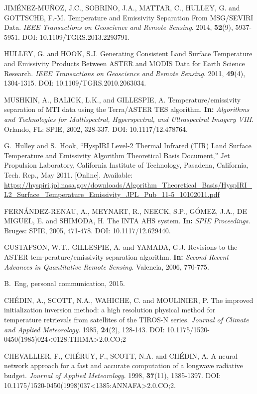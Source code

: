 \begin{thebibliography}{10}
 JIMÉNEZ-MUÑOZ, J.C., SOBRINO, J.A., MATTAR, C., HULLEY, G. and GOTTSCHE, F.-M. Temperature and Emissivity Separation From MSG/SEVIRI Data. \textit{IEEE Transactions on Geoscience and Remote Sensing}. 2014, \textbf{52}(9), 5937-5951. DOI: 10.1109/TGRS.2013.2293791. 

 HULLEY, G. and HOOK, S.J. Generating Consistent Land Surface Temperature and Emissivity Products Between ASTER and MODIS Data for Earth Science Research. \textit{IEEE Transactions on Geoscience and Remote Sensing}. 2011, \textbf{49}(4), 1304-1315. DOI: 10.1109/TGRS.2010.2063034.

 MUSHKIN, A., BALICK, L.K., and GILLESPIE, A. Temperature/emissivity separation of MTI data using the Terra/ASTER TES algorithm. \textbf{In:} \textit{Algorithms and Technologies for Multispectral, Hyperspectral, and Ultraspectral Imagery VIII}. Orlando, FL: SPIE, 2002, 328-337. DOI: 10.1117/12.478764.

G.~Hulley and S.~Hook, ``{HyspIRI} {Level}-2 {Thermal} {Infrared} ({TIR})
  {Land} {Surface} {Temperature} and {Emissivity} {Algorithm} {Theoretical}
  {Basis} {Document},'' Jet Propulsion Laboratory, California Institute of
  Technology, Pasadena, California, Tech. Rep., May 2011. [Online]. Available:
  \url{https://hyspiri.jpl.nasa.gov/downloads/Algorithm_Theoretical_Basis/HyspIRI_L2_Surface_Temperature_Emissivity_JPL_Pub_11-5_10102011.pdf}

 FERNÁNDEZ-RENAU, A., MEYNART, R., NEECK, S.P., GÓMEZ, J.A., DE MIGUEL, E. and SHIMODA, H. The INTA AHS system. \textbf{In:} \textit{SPIE Proceedings}. Bruges: SPIE, 2005, 471-478. DOI: 10.1117/12.629440.

 GUSTAFSON, W.T., GILLESPIE, A. and YAMADA, G.J. Revisions to the ASTER tem-perature/emissivity separation algorithm. \textbf{In:} \textit{Second Recent Advances in Quantitative Remote Sensing}. Valencia, 2006, 770-775.


B.~Eng, personal communication, 2015.

 CHÉDIN, A., SCOTT, N.A., WAHICHE, C. and MOULINIER, P. The improved initialization inversion method: a high resolution physical method for temperature retrievals from satellites of the TIROS-N series. \textit{Journal of Climate and Applied Meteorology}. 1985, \textbf{24}(2), 128-143. DOI: 10.1175/1520-0450(1985)024<0128:TIIIMA>2.0.CO;2

 CHEVALLIER, F., CHÉRUY, F., SCOTT, N.A. and CHÉDIN, A. A neural network approach for a fast and accurate computation of a longwave radiative budget. \textit{Journal of Applied Meteorology}. 1998, \textbf{37}(11), 1385-1397. DOI: 10.1175/1520-0450(1998)037<1385:ANNAFA>2.0.CO;2.


\end{thebibliography}
